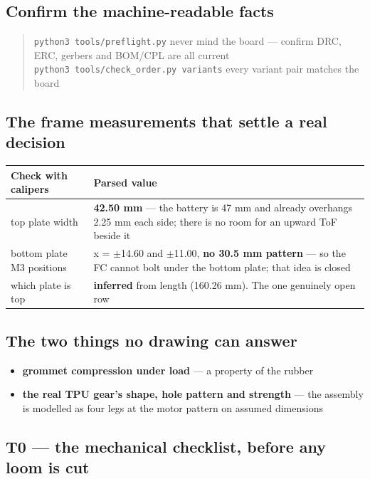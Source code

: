 \documentclass[11pt,a4paper]{article}
\newcommand{\cmd}[1]{\texttt{\small #1}}
\begin{document}
\subsection{Confirm the machine-readable facts}

\begin{quote}
\cmd{python3 tools/preflight.py} \quad never mind the board --- confirm DRC, ERC, gerbers
and BOM/CPL are all current\\
\cmd{python3 tools/check\_order.py variants} \quad every variant pair matches the board
\end{quote}

\subsection{The frame measurements that settle a real decision}

\begin{center}
\begin{tabular}{@{}p{}p{}@{}}
\toprule
\textbf{Check with calipers} & \textbf{Parsed value} \\
\midrule
top plate width & \textbf{42.50 mm} --- the battery is 47 mm and already overhangs 2.25 mm
each side; there is no room for an upward ToF beside it \\
bottom plate M3 positions & x = $\pm$14.60 and $\pm$11.00, \textbf{no 30.5 mm pattern} --- so
the FC cannot bolt under the bottom plate; that idea is closed \\
which plate is top & \textbf{inferred} from length (160.26 mm). The one genuinely open row \\
\bottomrule
\end{tabular}
\end{center}

\subsection{The two things no drawing can answer}

\begin{itemize}
\item \textbf{grommet compression under load} --- a property of the rubber
\item \textbf{the real TPU gear's shape, hole pattern and strength} --- the assembly is
modelled as four legs at the motor pattern on assumed dimensions
\end{itemize}

\subsection{T0 --- the mechanical checklist, before any loom is cut}
\label{sec:T0}
\end{document}
